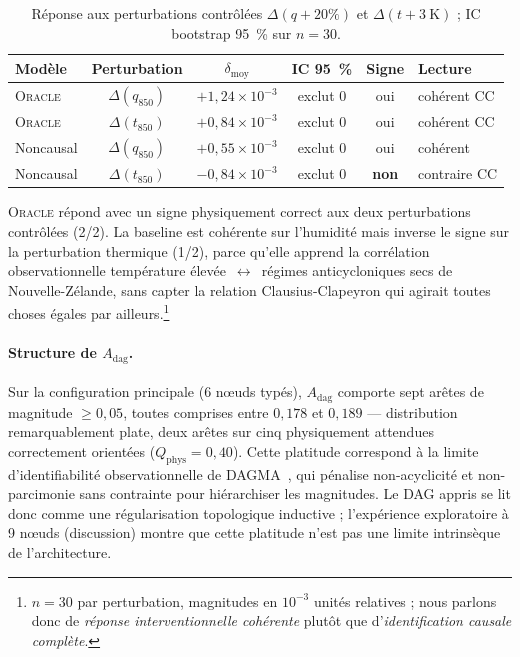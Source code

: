 \documentclass[14pt,a4paper,openany]{extreport}
\newcommand{\Oracle}{\textsc{Oracle}}
\newcommand{\Adag}{\ensuremath{A_{\mathrm{dag}}}}
\begin{document}
\begin{table}[ht]
  \centering
  \small
  \caption[Réponse aux perturbations contrôlées]{Réponse aux perturbations contrôlées $\Delta(q +20\%)$ et $\Delta(t +3~\mathrm{K})$ ; IC bootstrap 95~\% sur $n = 30$.}
  \label{tab:exp-res-int}
  \begin{tabularx}{\linewidth}{l c c c c X}
    \toprule
    \textbf{Modèle} & \textbf{Perturbation} & $\delta_{\mathrm{moy}}$ & \textbf{IC 95~\%} & \textbf{Signe} & \textbf{Lecture} \\
    \midrule
    \Oracle{} & $\Delta(q_{850})$ & $+1{,}24 \times 10^{-3}$ & exclut 0 & oui & cohérent CC \\
    \Oracle{} & $\Delta(t_{850})$ & $+0{,}84 \times 10^{-3}$ & exclut 0 & oui & cohérent CC \\
    Noncausal & $\Delta(q_{850})$ & $+0{,}55 \times 10^{-3}$ & exclut 0 & oui & cohérent \\
    Noncausal & $\Delta(t_{850})$ & $-0{,}84 \times 10^{-3}$ & exclut 0 & \textbf{non} & contraire CC \\
    \bottomrule
  \end{tabularx}
\end{table}

\Oracle{} répond avec un signe physiquement correct aux deux perturbations contrôlées (2/2). La baseline est cohérente sur l'humidité mais inverse le signe sur la perturbation thermique (1/2), parce qu'elle apprend la corrélation observationnelle température élevée~$\leftrightarrow$~régimes anticycloniques secs de Nouvelle-Zélande, sans capter la relation Clausius-Clapeyron qui agirait toutes choses égales par ailleurs.\footnote{$n=30$ par perturbation, magnitudes en $10^{-3}$ unités relatives ; nous parlons donc de \emph{réponse interventionnelle cohérente} plutôt que d'\emph{identification causale complète}.}

\paragraph{Structure de $\Adag$.} Sur la configuration principale (6 nœuds typés), $\Adag$ comporte sept arêtes de magnitude $\geq 0{,}05$, toutes comprises entre $0{,}178$ et $0{,}189$ --- distribution remarquablement plate, deux arêtes sur cinq physiquement attendues correctement orientées ($Q_{\mathrm{phys}}=0{,}40$). Cette platitude correspond à la limite d'identifiabilité observationnelle de DAGMA~\cite{pearl_causality_2009}, qui pénalise non-acyclicité et non-parcimonie sans contrainte pour hiérarchiser les magnitudes. Le DAG appris se lit donc comme une régularisation topologique inductive ; l'expérience exploratoire à 9 nœuds (discussion) montre que cette platitude n'est pas une limite intrinsèque de l'architecture.
\end{document}
